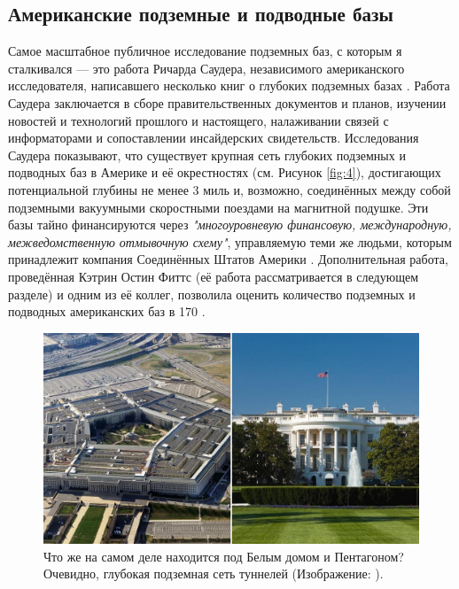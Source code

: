 \documentclass[10pt,twocolumn,letterpaper]{article}
\begin{document}
\subsection{Американские подземные и подводные базы}

Самое масштабное публичное исследование подземных баз, с которым я сталкивался — это работа Ричарда Саудера, независимого американского исследователя, написавшего несколько книг о глубоких подземных базах \cite{22}. Работа Саудера заключается в сборе правительственных документов и планов, изучении новостей и технологий прошлого и настоящего, налаживании связей с информаторами и сопоставлении инсайдерских свидетельств. Исследования Саудера показывают, что существует крупная сеть глубоких подземных и подводных баз в Америке и её окрестностях (см. Рисунок \ref{fig:4}), достигающих потенциальной глубины не менее 3 миль и, возможно, соединённых между собой подземными вакуумными скоростными поездами на магнитной подушке. Эти базы тайно финансируются через \textit{"многоуровневую финансовую, международную, межведомственную отмывочную схему"}, управляемую теми же людьми, которым принадлежит компания Соединённых Штатов Америки \cite{22}. Дополнительная работа, проведённая Кэтрин Остин Фиттс (её работа рассматривается в следующем разделе) и одним из её коллег, позволила оценить количество подземных и подводных американских баз в 170 \cite{16,20}.

\begin{figure}[b]
\begin{center}

   \includegraphics[width=1\linewidth]{penta.jpg}
\end{center}
   \caption{Что же на самом деле находится под Белым домом и Пентагоном? Очевидно, глубокая подземная сеть туннелей (Изображение: \cite{31}).}
\label{fig:3}
\label{fig:onecol}
\end{figure}
\end{document}
